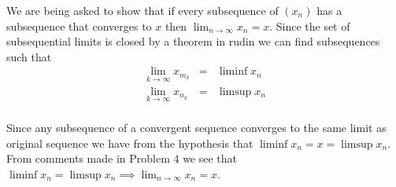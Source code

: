 \documentclass[11pt,reqno]{article}
\begin{document}
We are being asked to show that if every subsequence of $(x_n)$ has a subsequence that converges to $x$ then $\lim_{n \to \infty} x_n = x$. Since the set of subsequential limits is closed by a theorem in rudin we can find subsequences such that 
\begin{eqnarray*}
\lim_{k \to \infty} x_{m_k} &=& \liminf x_n \\
\lim_{k \to \infty} x_{n_k} &=& \limsup x_n \\
\end{eqnarray*}

Since any subsequence of a convergent sequence converges to the same limit as original sequence we have from the hypothesis that $\liminf x_n = x = \limsup x_n$. From comments made in Problem 4 we see that $\liminf x_n = \limsup x_n \implies \lim_{n \to \infty} x_n = x$.
\end{document}
